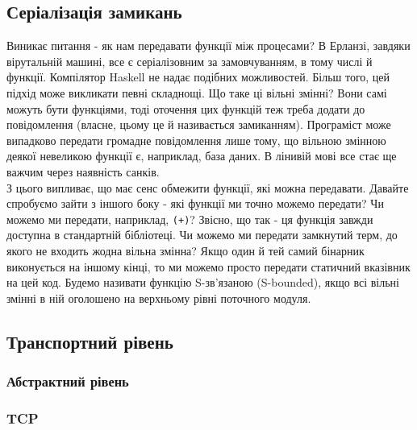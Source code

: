 \documentclass[12pt]{article}
\begin{document}
\subsection{Серіалізація замикань}

Виникає питання - як нам передавати функції між процесами? В Ерланзі, завдяки вірутальній машині, все є серіалізовним за замовчуванням, в тому числі й функції. Компілятор Haskell не надає подібних можливостей. Більш того, цей підхід може викликати певні складнощі. Що таке ці вільні змінні? Вони самі можуть бути функціями, тоді оточення цих функцій теж треба додати до повідомлення (власне, цьому це й називається замиканням). Програміст може випадково передати громадне повідомлення лише тому, що вільною змінною деякої невеликою функції є, наприклад, база даних. В лінивій мові все стає ще важчим через наявність санків.\\

З цього випливає, що має сенс обмежити функції, які можна передавати. Давайте спробуємо зайти з іншого боку - які функції ми точно можемо передати? Чи можемо ми передати, наприклад, \lstinline{(+)}? Звісно, що так - ця функція завжди доступна в стандартній бібліотеці. Чи можемо ми передати замкнутий терм, до якого не входить жодна вільна змінна? Якщо один й тей самий бінарник виконується на іншому кінці, то ми можемо просто передати статичний вказівник на цей код. Будемо називати функцію S-зв'язаною (S-bounded), якщо всі вільні змінні в ній оголошено на верхньому рівні поточного модуля.\\ 

\subsection{Транспортний рівень}
\subsubsection*{Абстрактний рівень}
\subsubsection*{TCP}
\end{document}
